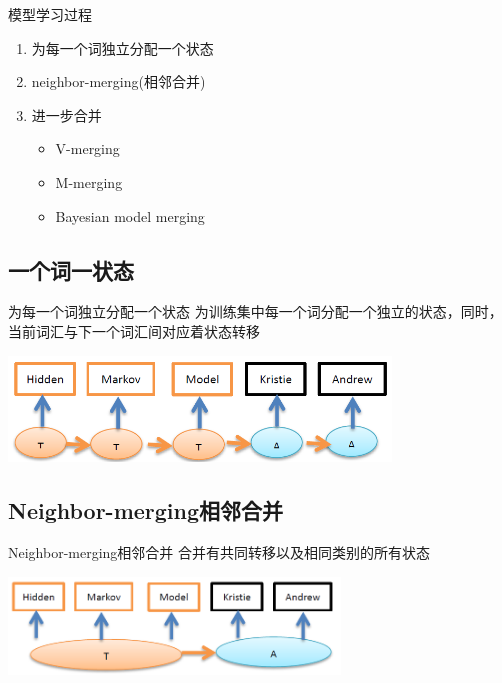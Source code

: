 \documentclass{beamer}
\begin{document}
\begin{frame}{模型学习过程}
    \begin{enumerate}
        \item 为每一个词独立分配一个状态
        \item neighbor-merging(相邻合并)
        \item 进一步合并
            \begin{itemize}
                \item V-merging
                \item M-merging
                \item Bayesian model merging
            \end{itemize}
    \end{enumerate}
\end{frame}

\subsection{一个词一状态}
\begin{frame}{为每一个词独立分配一个状态}
    为训练集中每一个词分配一个独立的状态，同时，当前词汇与下一个词汇间对应着状态转移
    \begin{center}
        \includegraphics[height=80pt]{report5/neighbor-1.png}
    \end{center}
\end{frame}

\subsection{Neighbor-merging相邻合并}
\begin{frame}{Neighbor-merging相邻合并}
    合并有共同转移以及相同类别的所有状态
    \begin{center}
        \includegraphics[width=250pt]{report5/neighbor-2.png}
    \end{center}
\end{frame}
\end{document}
